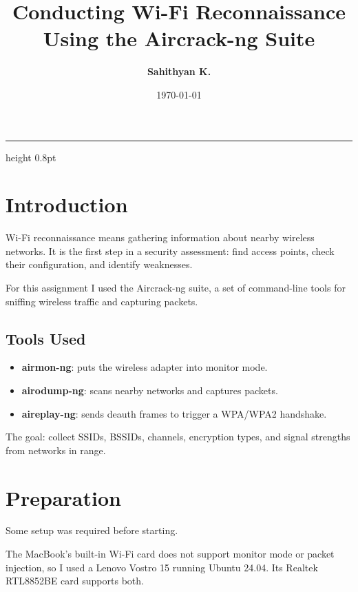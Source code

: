 \documentclass[12pt,a4paper]{article}
\title{%
  {\color{accent}\Large\bfseries Conducting Wi-Fi Reconnaissance}\\[4pt]
  {\color{textgrey}\normalsize Using the Aircrack-ng Suite}%
}
\author{\bfseries Sahithyan K.\quad{\normalfont\color{textgrey}(230557T)}}
\date{\color{textgrey}\today}
\begin{document}
\maketitle
\thispagestyle{empty}

\vspace{-6pt}
{\color{accent!30}\hrule height 0.8pt}
\vspace{16pt}

\tableofcontents
\newpage

\section{Introduction}

Wi-Fi reconnaissance means gathering information about nearby wireless networks. It is the first step in a security assessment: find access points, check their configuration, and identify weaknesses.

For this assignment I used the Aircrack-ng suite, a set of command-line tools for sniffing wireless traffic and capturing packets.

\subsection{Tools Used}

\begin{itemize}
    \item \textbf{airmon-ng}: puts the wireless adapter into monitor mode.
    \item \textbf{airodump-ng}: scans nearby networks and captures packets.
    \item \textbf{aireplay-ng}: sends deauth frames to trigger a WPA/WPA2 handshake.
\end{itemize}

The goal: collect SSIDs, BSSIDs, channels, encryption types, and signal strengths from networks in range.

\section{Preparation}

Some setup was required before starting.

The MacBook's built-in Wi-Fi card does not support monitor mode or packet injection, so I used a Lenovo Vostro 15 running Ubuntu 24.04. Its Realtek RTL8852BE card supports both.
\end{document}

